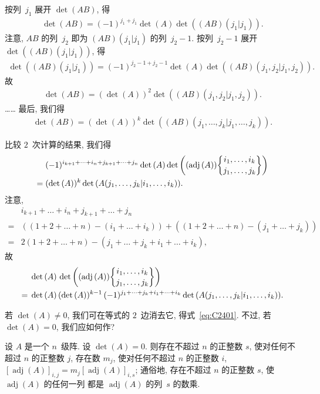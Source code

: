 \documentclass[../libro.tex]{subfiles}
\begin{document}
按列~\(j_1\) 展开 \(\det {(AB)}\), 得
\begin{align*}
    \det {(AB)} = (-1)^{j_1+j_1} \det {(A)}
    \det {((AB)(j_1|j_1))}.
\end{align*}
注意, \(AB\) 的列~\(j_2\) 即为
\((AB)(j_1|j_1)\) 的列~\(j_2-1\).
按列~\(j_2-1\) 展开 \(\det {((AB)(j_1|j_1))}\),
得
\begin{align*}
    \det {((AB)(j_1|j_1))}
    = (-1)^{j_2-1+j_2-1} \det {(A)}
    \det {((AB)({j_1,j_2}|{j_1,j_2}))}.
\end{align*}
故
\begin{align*}
    \det {(AB)} = (\det {(A)})^2
    \det {((AB)({j_1,j_2}|{j_1,j_2}))}.
\end{align*}
……
最后, 我们得
\begin{align*}
    \det {(AB)}
    = (\det {(A)})^k
    \det {((AB)({j_1,\dots,j_k}|{j_1,\dots,j_k}))}.
\end{align*}

比较 \(2\)~次计算的结果, 我们得
\begin{align*}
    &
    (-1)^{i_{k+1}+\dots+i_n+j_{k+1}+\dots+j_n}
    \det {(A)}
    \det {\left(
            (\operatorname{adj} {(A)})
            \submat{i_1,\dots,i_k}{j_1,\dots,j_k}
    \right)}
    \\
    = {} &
    (\det {(A)})^k
    \det {(A({j_1,\dots,j_k}|{i_1,\dots,i_k}))}.
\end{align*}
注意,
\begin{align*}
    &
    i_{k+1} + \dots + i_n + j_{k+1} + \dots + j_n
    \\
    = {} &
    ((1 + 2 + \dots + n) - (i_1 + \dots + i_k))
    + ((1 + 2 + \dots + n) - (j_1 + \dots + j_k))
    \\
    = {} &
    2(1 + 2 + \dots + n) - (j_1 + \dots + j_k + i_1 + \dots + i_k),
\end{align*}
故
\begin{align*}
    &
    \det {(A)}\,
    \det {\left(
            (\operatorname{adj} {(A)})
            \submat{i_1,\dots,i_k}{j_1,\dots,j_k}
    \right)}
    \\
    = {} &
    \det {(A)}\, (\det {(A)})^{k-1}\,
    (-1)^{j_1+\dots+j_k+i_1+\dots+i_k}
    \det {(A({j_1,\dots,j_k}|{i_1,\dots,i_k}))}.
\end{align*}

若 \(\det {(A)} \neq 0\),
我们可在等式的 \(2\)~边消去它, 得式~\eqref{eq:C2401}.
不过, 若 \(\det {(A)} = 0\),
我们应如何作?

\begin{theorem}
    设 \(A\) 是一个 \(n\)~级阵.
    设 \(\det {(A)} = 0\).
    则存在不超过 \(n\) 的正整数 \(s\),
    使对任何不超过 \(n\) 的正整数 \(j\),
    存在数 \(m_j\),
    使对任何不超过 \(n\) 的正整数 \(i\),
    \([\operatorname{adj} {(A)}]_{i,j}
    = m_j [\operatorname{adj} {(A)}]_{i,s}\);
    通俗地,
    存在不超过 \(n\) 的正整数 \(s\),
    使 \(\operatorname{adj} {(A)}\) 的任何一列%
    都是 \(\operatorname{adj} {(A)}\) 的列~\(s\) 的数乘.
\end{theorem}
\end{document}
